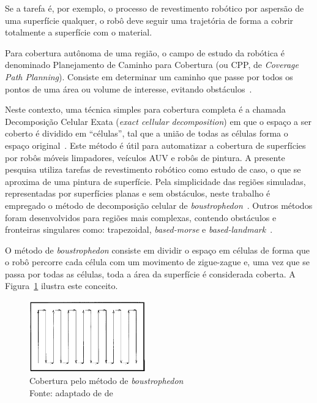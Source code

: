 Se a tarefa é, por exemplo, o processo de revestimento robótico por aspersão de
uma superfície qualquer, o robô deve seguir uma trajetória de forma a cobrir
totalmente a superfície com o material.

Para cobertura autônoma de uma região, o campo de estudo da robótica é
denominado Planejamento de Caminho para Cobertura (ou CPP, de \textit{Coverage Path
Planning}). Consiste em determinar um caminho que passe por todos os
pontos de uma área ou volume de interesse, evitando
obstáculos~\cite{galceran2013survey}.

Neste contexto, uma técnica simples para cobertura completa é a chamada
Decomposição Celular Exata (\textit{exact cellular decomposition}) em que o
espaço a ser coberto é dividido em ``células'', tal que a união de todas as
células forma o espaço original~\cite{latombe1991exact}. Este método é útil para
automatizar a cobertura de superfícies por robôs móveis limpadores, veículos AUV
e robôs de pintura. A presente pesquisa utiliza tarefas de revestimento robótico
como estudo de caso, o que se aproxima de uma pintura de superfície.
Pela simplicidade das regiões simuladas, representadas por superfícies planas e
sem obstáculos, neste trabalho é empregado o método de decomposição celular de
\textit{boustrophedon}~\cite{choset2000coverage}. Outros métodos foram
desenvolvidos para regiões mais complexas, contendo obstáculos e fronteiras
singulares como: trapezoidal, \textit{based-morse} e
\textit{based-landmark}~\cite{galceran2013survey}.

O método de \textit{boustrophedon} consiste em dividir o espaço em células de
forma que o robô percorre cada célula com um movimento de zigue-zague e, uma vez
que se passa por todas as células, toda a área da superfície é considerada
coberta. A Figura~\ref{fig::boustrophedon} ilustra este conceito.

\begin{figure}[h]
	\centering 
 	\includegraphics[width=0.45\textwidth]{figs/boustrophedon}
 	\caption[Cobertura pelo método de \textit{boustrophedon}]{Cobertura pelo
 	método de \textit{boustrophedon} \\ Fonte: adaptado de
 	de~\cite{choset2000coverage}}
 	\label{fig::boustrophedon}
\end{figure}

